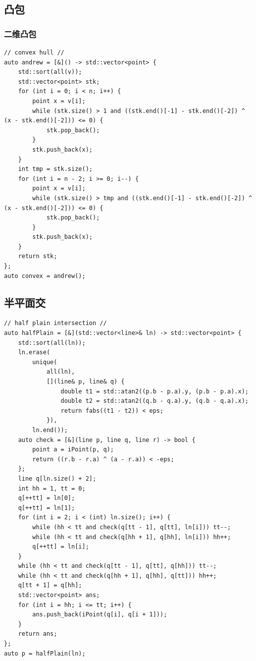 \documentclass[UTF8, a4paper, titlepage, twoside]{ctexart}
\begin{document}
\subsection{ 凸包 }
\subsubsection{ 二维凸包 }
\begin{lstlisting}
// convex hull //
auto andrew = [&]() -> std::vector<point> {
    std::sort(all(v));
    std::vector<point> stk;
    for (int i = 0; i < n; i++) {
        point x = v[i];
        while (stk.size() > 1 and ((stk.end()[-1] - stk.end()[-2]) ^ (x - stk.end()[-2])) <= 0) {
            stk.pop_back();
        }
        stk.push_back(x);
    }
    int tmp = stk.size();
    for (int i = n - 2; i >= 0; i--) {
        point x = v[i];
        while (stk.size() > tmp and ((stk.end()[-1] - stk.end()[-2]) ^ (x - stk.end()[-2])) <= 0) {
            stk.pop_back();
        }
        stk.push_back(x);
    }
    return stk;
};
auto convex = andrew();
\end{lstlisting}

\subsection{ 半平面交 }
\begin{lstlisting}
// half plain intersection //
auto halfPlain = [&](std::vector<line>& ln) -> std::vector<point> {
    std::sort(all(ln));
    ln.erase(
        unique(
            all(ln),
            [](line& p, line& q) {
                double t1 = std::atan2((p.b - p.a).y, (p.b - p.a).x);
                double t2 = std::atan2((q.b - q.a).y, (q.b - q.a).x);
                return fabs((t1 - t2)) < eps;
            }),
        ln.end());
    auto check = [&](line p, line q, line r) -> bool {
        point a = iPoint(p, q);
        return ((r.b - r.a) ^ (a - r.a)) < -eps;
    };
    line q[ln.size() + 2];
    int hh = 1, tt = 0;
    q[++tt] = ln[0];
    q[++tt] = ln[1];
    for (int i = 2; i < (int) ln.size(); i++) {
        while (hh < tt and check(q[tt - 1], q[tt], ln[i])) tt--;
        while (hh < tt and check(q[hh + 1], q[hh], ln[i])) hh++;
        q[++tt] = ln[i];
    }
    while (hh < tt and check(q[tt - 1], q[tt], q[hh])) tt--;
    while (hh < tt and check(q[hh + 1], q[hh], q[tt])) hh++;
    q[tt + 1] = q[hh];
    std::vector<point> ans;
    for (int i = hh; i <= tt; i++) {
        ans.push_back(iPoint(q[i], q[i + 1]));
    }
    return ans;
};
auto p = halfPlain(ln);
\end{lstlisting}
\end{document}
